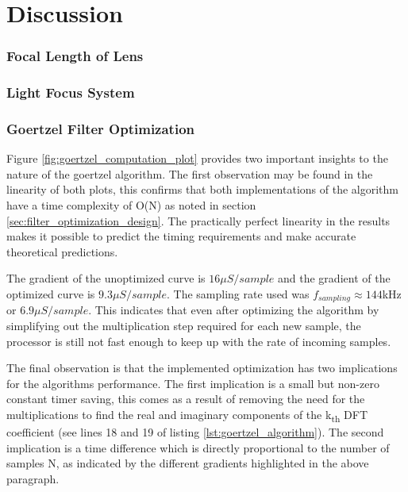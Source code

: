 \chapter{Discussion}
\label{ch_discussion}


\subsection{Focal Length of Lens}


\subsection{Light Focus System}


\subsection{Goertzel Filter Optimization}

Figure \ref{fig:goertzel_computation_plot} provides two important insights to the nature of the goertzel algorithm. The first observation may be found in the linearity of both plots, this confirms that both implementations of the algorithm have a time complexity of O(N) as noted in section \ref{sec:filter_optimization_design}. The practically perfect linearity in the results makes it possible to predict the timing requirements and make accurate theoretical predictions.

The gradient of the unoptimized curve is $16\mu S/sample$ and the gradient of the optimized curve is $9.3\mu S/sample$. The sampling rate used was $f_{sampling} \approx 144$kHz or $6.9\mu S/sample$. This indicates that even after optimizing the algorithm by simplifying out the multiplication step required for each new sample, the processor is still not fast enough to keep up with the rate of incoming samples.

The final observation is that the implemented optimization has two implications for the algorithms performance. The first implication is a small but non-zero constant timer saving, this comes as a result of removing the need for the multiplications to find the real and imaginary components of the k\textsubscript{th} DFT coefficient (see lines 18 and 19 of listing \ref{lst:goertzel_algorithm}). The second implication is a time difference which is directly proportional to the number of samples N, as indicated by the different gradients highlighted in the above paragraph.


